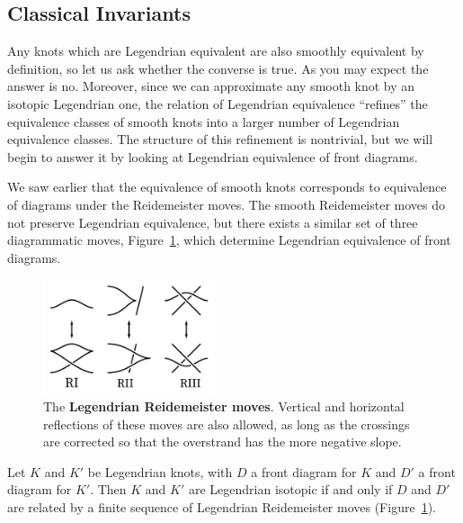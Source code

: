 \subsection{Classical Invariants}\label{subsec:invariants}

Any knots which are Legendrian equivalent are also smoothly equivalent by definition, so let us ask whether the converse is true.
As you may expect the answer is no. Moreover, since we can approximate any smooth knot by an isotopic Legendrian one, the relation of Legendrian equivalence ``refines'' the equivalence classes of smooth knots into a larger number of Legendrian equivalence classes.
The structure of this refinement is nontrivial, but we will begin to answer it by looking at Legendrian equivalence of front diagrams.

We saw earlier that the equivalence of smooth knots corresponds to equivalence of diagrams under the Reidemeister moves. The smooth Reidemeister moves do not preserve Legendrian equivalence, but there exists a similar set of three diagrammatic moves, Figure~\ref{fig:redemeister}, which determine Legendrian equivalence of front diagrams.

\begin{figure}[ht]
    \centering
    \includegraphics[width=0.45\textwidth]{images/redeimeister.pdf}
    \caption{The \textbf{Legendrian Reidemeister moves}. Vertical and horizontal reflections of these moves are also allowed, as long as the crossings are corrected so that the overstrand has the more negative slope.}%
    \label{fig:redemeister}
\end{figure}

\begin{theorem}
    Let $K$ and $K'$ be Legendrian knots, with $D$ a front diagram for $K$ and $D'$ a front diagram for $K'$.
    Then $K$ and $K'$ are Legendrian isotopic if and only if $D$ and $D'$ are related by a finite sequence of Legendrian Reidemeister moves (Figure~\ref{fig:redemeister}).
\end{theorem}

